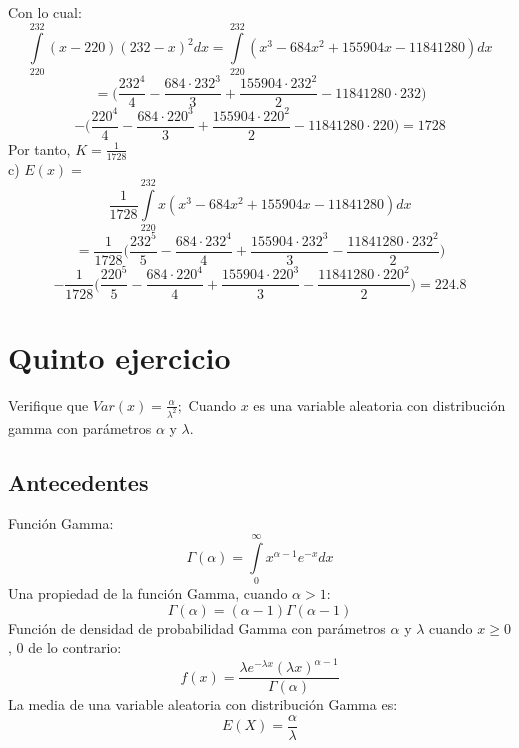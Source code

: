 \documentclass[12pt,letterpaper]{article}
\begin{document}
Con lo cual:
\begin{equation}
    \int\limits_{220}^{232} (x-220)(232-x)^{2}dx=\int\limits_{220}^{232}(x^{3}-684x^{2}+155904x-11841280)dx 
\end{equation}
\begin{equation}
    =\bigg( \frac{232^{4}}{4}-\frac{684\cdot232^{3}}{3}+\frac{155904\cdot232^{2}}{2}-11841280\cdot232 \bigg)
\end{equation}
\begin{equation}
    -\bigg( \frac{220^{4}}{4}-\frac{684\cdot220^{3}}{3}+\frac{155904\cdot220^{2}}{2}-11841280\cdot220 \bigg)=1728
\end{equation}
Por tanto, $K=\frac{1}{1728}$\\
c) $E(x)=$
\begin{equation}
    \frac{1}{1728}\int\limits_{220}^{232}x(x^{3}-684x^{2}+155904x-11841280)dx 
\end{equation}
\begin{equation}
    =\frac{1}{1728}\bigg( \frac{232^{5}}{5}-\frac{684\cdot232^{4}}{4}+\frac{155904\cdot232^{3}}{3}-\frac{11841280\cdot232^{2}}{2} \bigg)
\end{equation}
\begin{equation}
    -\frac{1}{1728}\bigg( \frac{220^{5}}{5}-\frac{684\cdot220^{4}}{4}+\frac{155904\cdot220^{3}}{3}-\frac{11841280\cdot220^{2}}{2} \bigg)=224.8
\end{equation}


\section{Quinto ejercicio}
Verifique que $Var(x)=\frac{\alpha}{\lambda^{2}};$ Cuando $x$ es una variable aleatoria con distribución gamma con parámetros $\alpha$ y $\lambda$.\cite{ross}
\subsection{Antecedentes}
Función Gamma:
\begin{equation}
    \Gamma \left( \alpha \right) = \int\limits_0^\infty {x^{\alpha - 1} e^{-x} dx}
\end{equation}
Una propiedad de la función Gamma, cuando $\alpha>1$:
\begin{equation}
    \Gamma \left( \alpha \right) =(\alpha-1) \Gamma \left( \alpha -1\right)
\end{equation}
Función de densidad de probabilidad Gamma con parámetros $\alpha$ y $\lambda$ cuando $x \geq 0$, $0$ de lo contrario:
\begin{equation}
    f(x)=\frac{\lambda e^{-\lambda x}(\lambda x)^{\alpha-1}}{\Gamma(\alpha)}
\end{equation}
La media de una variable aleatoria con distribución Gamma es:
\begin{equation}
    E(X) = \frac{\alpha}{\lambda}
\end{equation}
\end{document}

